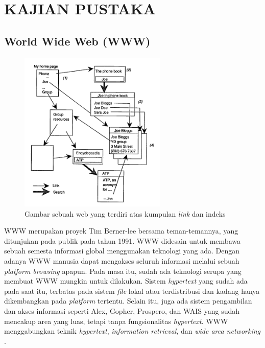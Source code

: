 
\chapter{KAJIAN PUSTAKA} 

\section{World Wide Web (WWW)}

\begin{figure}[H]
	\centering
	\includegraphics[keepaspectratio, width=7cm]{gambar/w3_model}
	\caption{Gambar sebuah web yang terdiri atas kumpulan \textit{link} dan indeks \citep{bernersLee1992}}
	\label{gambar:w3_model}
\end{figure}

WWW merupakan proyek Tim Berner-lee bersama teman-temannya, yang ditunjukan pada publik pada tahun 1991. WWW didesain untuk membawa sebuah semesta informasi global menggunakan teknologi yang ada. Dengan adanya WWW manusia dapat mengakses seluruh informasi melalui sebuah \textit{platform browsing} apapun. Pada masa itu, sudah ada teknologi serupa yang membuat WWW mungkin untuk dilakukan. Sistem \textit{hypertext} yang sudah ada pada saat itu, terbatas pada sistem \textit{file} lokal atau terdistribusi dan kadang hanya dikembangkan pada \textit{platform} tertentu. Selain itu, juga ada sistem pengambilan dan akses informasi seperti Alex, Gopher, Prospero, dan WAIS yang sudah mencakup area yang luas, tetapi tanpa fungsionalitas \textit{hypertext}. WWW menggabungkan teknik \textit{hypertext}, \textit{information retrieval}, dan \textit{wide area networking} \citep{bernersLee1992}.

